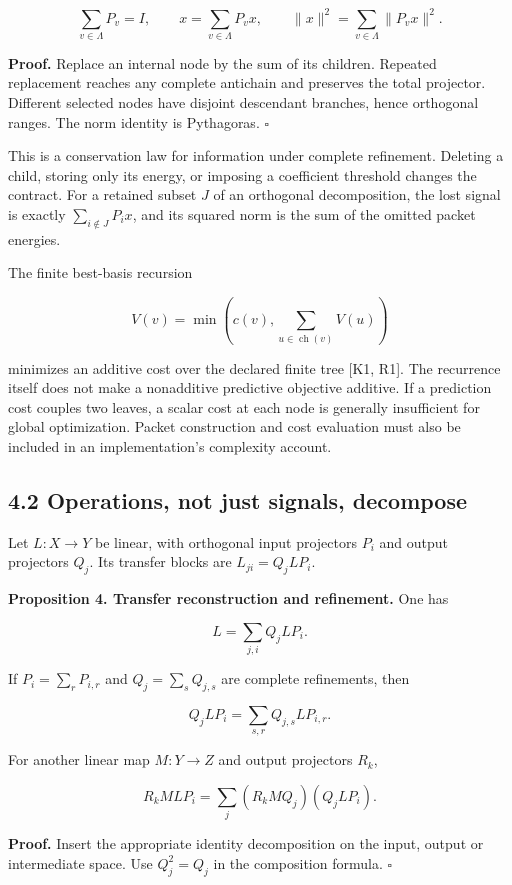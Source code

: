 \[
\sum_{v\in\Lambda}P_v=I,\qquad
x=\sum_{v\in\Lambda}P_vx,\qquad
\|x\|^2=\sum_{v\in\Lambda}\|P_vx\|^2.
\]

\textbf{Proof.} Replace an internal node by the sum of its children.
Repeated replacement reaches any complete antichain and preserves the
total projector. Different selected nodes have disjoint descendant
branches, hence orthogonal ranges. The norm identity is Pythagoras.
\(\square\)

This is a conservation law for information under complete refinement.
Deleting a child, storing only its energy, or imposing a coefficient
threshold changes the contract. For a retained subset \(J\) of an
orthogonal decomposition, the lost signal is exactly
\(\sum_{i\notin J}P_ix\), and its squared norm is the sum of the omitted
packet energies.

The finite best-basis recursion

\[
V(v)=\min\left(c(v),\sum_{u\in\operatorname{ch}(v)}V(u)\right)
\]

minimizes an additive cost over the declared finite tree {[}K1, R1{]}.
The recurrence itself does not make a nonadditive predictive objective
additive. If a prediction cost couples two leaves, a scalar cost at each
node is generally insufficient for global optimization. Packet
construction and cost evaluation must also be included in an
implementation's complexity account.

\subsection{4.2 Operations, not just signals,
decompose}\label{LSM:operations-not-just-signals-decompose}

Let \(L:X\to Y\) be linear, with orthogonal input projectors \(P_i\) and
output projectors \(Q_j\). Its transfer blocks are \(L_{ji}=Q_jLP_i\).

\textbf{Proposition 4. Transfer reconstruction and refinement.} One has

\[
L=\sum_{j,i}Q_jLP_i.
\]

If \(P_i=\sum_rP_{i,r}\) and \(Q_j=\sum_sQ_{j,s}\) are complete
refinements, then

\[
Q_jLP_i=\sum_{s,r}Q_{j,s}LP_{i,r}.
\]

For another linear map \(M:Y\to Z\) and output projectors \(R_k\),

\[
R_kMLP_i=\sum_j(R_kMQ_j)(Q_jLP_i).
\]

\textbf{Proof.} Insert the appropriate identity decomposition on the
input, output or intermediate space. Use \(Q_j^2=Q_j\) in the
composition formula. \(\square\)

